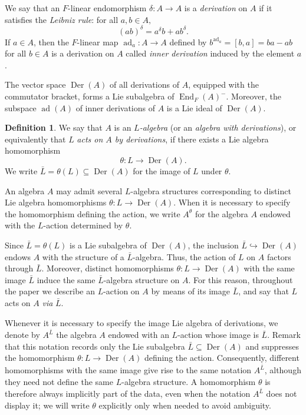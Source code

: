 \documentclass[a4paper,reqno]{amsart}
\theoremstyle{definition}
\newtheorem{definition}[theorem]{Definition}
\numberwithin{equation}{section}
\numberwithin{theorem}{section}
\DeclareMathOperator{\ad}{ad}
\DeclareMathOperator{\D}{Der}
\DeclareMathOperator{\E}{End}
\begin{document}
We say that an $F$-linear endomorphism $\delta:A \to A$ is a \textit{derivation} on $A$ if it satisfies the \textit{Leibniz rule}: for all $a,b\in A,$
$$(a b)^\delta=a^\delta b + ab^\delta.$$ 
If $a\in A$, then the $F$-linear map $\ad_a:A\to A$ defined by $ b^{\ad_a}=[b,a]=ba-ab$ for all $b\in A$ is a derivation on $A$ called \textit{inner derivation} induced by the element $a$.

The vector space $\D(A)$ of all derivations of $A$, equipped with the commutator bracket, forms a Lie subalgebra of $\E_F(A)^-$. Moreover, the subspace $\ad (A)$ of inner derivations of $A$ is a Lie ideal of $\D(A)$.

\begin{definition}
    We say that $A$ is an \emph{$L$-algebra} (or an \emph{algebra with derivations}), or equivalently that $L$ \emph{acts on $A$ by derivations},  if there exists a Lie algebra homomorphism
    $$
    \theta\colon L\to\D(A).
    $$
    We write $ \bar L=\theta(L)\subseteq\D(A)$ for the image of $L$ under $\theta$.
\end{definition}


An algebra $A$ may admit several $L$-algebra structures corresponding to distinct Lie algebra homomorphisms $\theta\colon L\to\D(A).$  When it is necessary to specify the homomorphism defining the action, we write $A^\theta$ for the algebra $A$ endowed with the $L$-action determined by $\theta$.



Since $\bar L=\theta(L)$ is a Lie subalgebra of $\D(A)$, the inclusion $\bar L\hookrightarrow\D(A)$
endows $A$ with the structure of a $\bar L$-algebra.
Thus, the action of $L$ on $A$ factors through $\bar L$. Moreover, distinct homomorphisms $ \theta\colon L\to\D(A)$ with the same image $\bar L$ induce the same $\bar L$-algebra structure on $A$. For this reason, throughout the paper we describe an $L$-action on $A$ by means of its image $\bar L$, and say that $L$ acts on $A$ \emph{via} $\bar L$. 

Whenever it is necessary to specify the image Lie algebra of derivations, we denote by
$A^{\bar L}$ the algebra $A$ endowed with an $L$-action whose image is $\bar L.$ 
Remark that this notation records only the Lie subalgebra $\bar L\subseteq\D(A)$ and suppresses the homomorphism
$\theta\colon L\to\D(A)$ defining the action.
Consequently, different homomorphisms with the same image give rise to the same notation
$A^{\bar L}$, although they need not define the same $L$-algebra structure. A homomorphism $\theta$ is therefore always implicitly part of the data, even when the notation
$A^{\bar L}$ does not display it; we will write $\theta$ explicitly only when
needed to avoid ambiguity.
\end{document}
